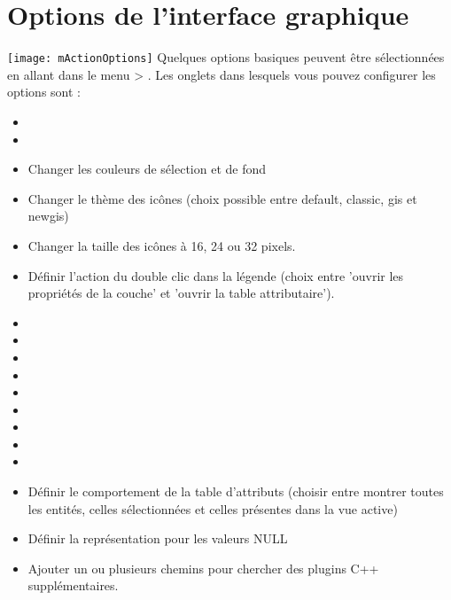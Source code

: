 \section{Options de l'interface graphique} \label{subsec:gui_options}
\texttt{[image: mActionOptions]} 
Quelques options basiques peuvent être sélectionnées en allant dans le menu  >
. Les onglets dans lesquels vous pouvez configurer les options sont :


\begin{itemize}[label=--]
\item {}
\item {}
\item Changer les couleurs de sélection et de fond
\item Changer le thème des icônes (choix possible entre default, classic, gis et newgis)
\item Changer la taille des icônes à 16, 24 ou 32 pixels.
\item Définir l'action du double clic dans la légende (choix entre 'ouvrir les propriétés de la couche' et 
'ouvrir la table attributaire').
\item {}
\item {}
\item {}
\item {}
\item {}
\item {}
\item {}
\item {}
\item {}
\item Définir le comportement de la table d'attributs (choisir entre montrer 
toutes les entités, celles sélectionnées et celles présentes dans la vue active)
\item Définir la représentation pour les valeurs NULL
\item Ajouter un ou plusieurs chemins pour chercher des plugins C++ supplémentaires.
\end{itemize}

